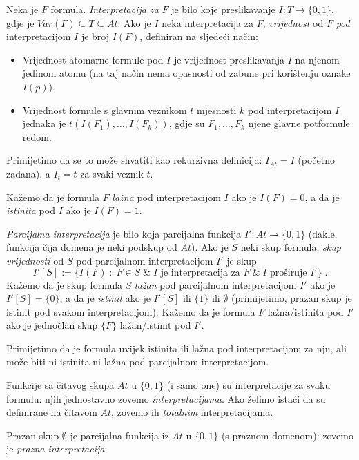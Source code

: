 \begin{definicija}
Neka je $F$ formula. \emph{Interpretacija za} $F$ je bilo koje preslikavanje $I:T\to\{0,1\}$, gdje je $Var(F)\subseteq T\subseteq At$. Ako je $I$ neka interpretacija za $F$, \emph{vrijednost} od $F$ \emph{pod} interpretacijom $I$ je broj $I(F)$, definiran na sljedeći način:
\begin{itemize}
\item Vrijednost atomarne formule pod $I$ je vrijednost preslikavanja $I$ na njenom jedinom atomu (na taj način nema opasnosti od zabune pri korištenju oznake $I(p)$).
\item Vrijednost formule s glavnim veznikom $t$ mjesnosti $k$ pod interpretacijom $I$ jednaka je $t(I(F_1),\ldots,I(F_k))$, gdje su $F_1,\ldots,F_k$ njene glavne potformule redom.
\end{itemize}

Primijetimo da se to može shvatiti kao rekurzivna definicija: $I_{At}=I$ (početno zadana), a $I_t=t$ za svaki veznik $t$.

Kažemo da je formula $F$ \emph{lažna} pod interpretacijom $I$ ako je $I(F)=0$, a da je \emph{istinita} pod $I$ ako je $I(F)=1$.

\emph{Parcijalna interpretacija} je bilo koja parcijalna funkcija $I':At\rightharpoonup\{0,1\}$ (dakle, funkcija čija domena je neki podskup od $At$). Ako je $S$ neki skup formula, \emph{skup vrijednosti} od $S$ pod parcijalnom interpretacijom $I'$ je skup $$I'[S]:=\Big\{I(F)\;:\;F\in S\;\&\;\mbox{$I$ je interpretacija za $F \;\&\; I$ proširuje $I'$}\Big\}\;.$$
Kažemo da je skup formula $S$ \emph{lažan} pod parcijalnom interpretacijom $I'$ ako je $I'[S]=\{0\}$, a da je \emph{istinit} ako je $I'[S]$ ili $\{1\}$ ili $\emptyset$ (primijetimo, prazan skup je istinit pod svakom interpretacijom). Kažemo da je formula $F$ lažna/istinita pod $I'$ ako je jednočlan skup $\{F\}$ lažan/istinit pod $I'$.
\end{definicija}

Primijetimo da je formula uvijek istinita ili lažna pod interpretacijom za nju, ali može biti ni istinita ni lažna pod parcijalnom interpretacijom.

Funkcije sa čitavog skupa $At$ u $\{0,1\}$ (i samo one) su interpretacije za svaku formulu: njih jednostavno zovemo \emph{interpretacijama}. Ako želimo istaći da su definirane na čitavom $At$, zovemo ih \emph{totalnim} interpretacijama.

Prazan skup $\emptyset$ je parcijalna funkcija iz $At$ u $\{0,1\}$ (s praznom domenom): zovemo je \emph{prazna interpretacija}.

